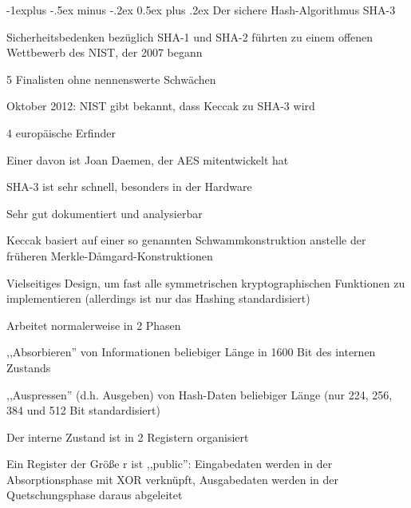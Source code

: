\documentclass[a4paper]{article}
\makeatletter
\renewcommand{\subsection}{\@startsection{subsection}{2}{0mm}%
 {-1explus -.5ex minus -.2ex}%
 {0.5ex plus .2ex}%
 {\normalfont\normalsize\bfseries}}
\makeatother
\begin{document}
\begin{multicols}{3}
      \subsection{Der sichere Hash-Algorithmus SHA-3}
      \begin{itemize*}
            \item Sicherheitsbedenken bezüglich SHA-1 und SHA-2 führten zu einem offenen Wettbewerb des NIST, der 2007 begann
            \begin{itemize*}
                  \item 5 Finalisten ohne nennenswerte Schwächen
                  \item Oktober 2012: NIST gibt bekannt, dass Keccak zu SHA-3 wird
                  \item 4 europäische Erfinder
                  \item Einer davon ist Joan Daemen, der AES mitentwickelt hat
                  \item SHA-3 ist sehr schnell, besonders in der Hardware
                  \item Sehr gut dokumentiert und analysierbar
            \end{itemize*}
            \item Keccak basiert auf einer so genannten Schwammkonstruktion anstelle der früheren Merkle-Dåmgard-Konstruktionen
            \begin{itemize*}
                  \item Vielseitiges Design, um fast alle symmetrischen kryptographischen Funktionen zu implementieren (allerdings ist nur das Hashing standardisiert)
            \end{itemize*}
            \item Arbeitet normalerweise in 2 Phasen
            \begin{itemize*}
                  \item ,,Absorbieren'' von Informationen beliebiger Länge in 1600 Bit des internen Zustands
                  \item ,,Auspressen'' (d.h. Ausgeben) von Hash-Daten beliebiger Länge (nur 224, 256, 384 und 512 Bit standardisiert)
            \end{itemize*}
            \item Der interne Zustand ist in 2 Registern organisiert
            \begin{itemize*}
                  \item Ein Register der Größe r ist ,,public'': Eingabedaten werden in der Absorptionsphase mit XOR verknüpft, Ausgabedaten werden in der Quetschungsphase daraus abgeleitet

\end{itemize*}
\end{itemize*}
\end{multicols}
\end{document}
